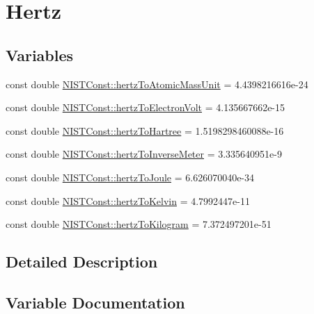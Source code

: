 \hypertarget{group___hertz}{}\section{Hertz}
\label{group___hertz}
\subsection*{Variables}
\begin{DoxyCompactItemize}
\item 
const double \hyperlink{group___hertz_ga5e2fd7ea13ae13a34435ff0578082d34}{N\+I\+S\+T\+Const\+::hertz\+To\+Atomic\+Mass\+Unit} = 4.\+4398216616e-\/24
\item 
const double \hyperlink{group___hertz_ga035f43de5d8ad8208675c53a0057d14d}{N\+I\+S\+T\+Const\+::hertz\+To\+Electron\+Volt} = 4.\+135667662e-\/15
\item 
const double \hyperlink{group___hertz_ga2ededb8b750b44cde6d83c1c07b6a870}{N\+I\+S\+T\+Const\+::hertz\+To\+Hartree} = 1.\+5198298460088e-\/16
\item 
const double \hyperlink{group___hertz_ga6d5ccd7fed8ad7f2abb5c368565a1666}{N\+I\+S\+T\+Const\+::hertz\+To\+Inverse\+Meter} = 3.\+335640951e-\/9
\item 
const double \hyperlink{group___hertz_ga827c4e99287fcd5363fabcfe1381cc37}{N\+I\+S\+T\+Const\+::hertz\+To\+Joule} = 6.\+626070040e-\/34
\item 
const double \hyperlink{group___hertz_gacda137a5d10ebba59b340d770802678f}{N\+I\+S\+T\+Const\+::hertz\+To\+Kelvin} = 4.\+7992447e-\/11
\item 
const double \hyperlink{group___hertz_ga7b63758ab74cb80c236d4eacd5b89484}{N\+I\+S\+T\+Const\+::hertz\+To\+Kilogram} = 7.\+372497201e-\/51
\end{DoxyCompactItemize}


\subsection{Detailed Description}


\subsection{Variable Documentation}
\mbox{\label{group___hertz_ga5e2fd7ea13ae13a34435ff0578082d34}} 
